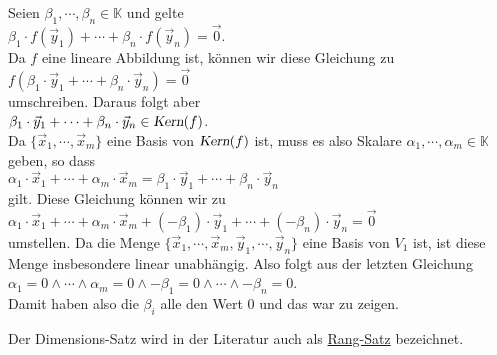 \begin{enumerate}
      Seien $\beta_1, \cdots, \beta_n \in \mathbb{K}$ und gelte
      \\[0.2cm]
      \hspace*{1.3cm}
      $\beta_1 \cdot f(\vec{y}_1) + \cdots + \beta_n \cdot f(\vec{y}_n) = \vec{0}$.
      \\[0.2cm]
      Da $f$ eine lineare Abbildung ist, k\"{o}nnen wir diese Gleichung zu
      \\[0.2cm]
      \hspace*{1.3cm}
      $f(\beta_1 \cdot \vec{y}_1 + \cdots + \beta_n \cdot \vec{y}_n) = \vec{0}$
      \\[0.2cm]
      umschreiben.  Daraus folgt aber
      \\[0.2cm]
      \hspace*{1.3cm}
      $\beta_1 \cdot \vec{y}_1 + \cdots + \beta_n \cdot \vec{y}_n \in \textsl{Kern}(f)$.
      \\[0.2cm]
      Da $\{ \vec{x}_1, \cdots, \vec{x}_m \}$ eine Basis von $\textsl{Kern}(f)$ ist, muss es also
      Skalare $\alpha_1, \cdots, \alpha_m \in \mathbb{K}$ geben, so dass
      \\[0.2cm]
      \hspace*{1.3cm}
      $\alpha_1 \cdot \vec{x}_1 + \cdots + \alpha_m \cdot \vec{x}_m = \beta_1 \cdot \vec{y}_1 + \cdots + \beta_n \cdot \vec{y}_n$
      \\[0.2cm]
      gilt.  Diese Gleichung k\"{o}nnen wir zu
      \\[0.2cm]
      \hspace*{1.3cm}
      $\alpha_1 \cdot \vec{x}_1 + \cdots + \alpha_m \cdot \vec{x}_m + (-\beta_1) \cdot \vec{y}_1 + \cdots + (-\beta_n) \cdot \vec{y}_n = \vec{0}$
      \\[0.2cm]
      umstellen.  Da die Menge $\{ \vec{x}_1, \cdots, \vec{x}_m,  \vec{y}_1, \cdots, \vec{y}_n \}$
      eine Basis von $V_1$ ist, ist diese Menge insbesondere linear unabh\"{a}ngig.  Also
      folgt aus der letzten Gleichung
      \\[0.2cm]
      \hspace*{1.3cm}
      $\alpha_1 = 0 \wedge \cdots \wedge \alpha_m = 0 \wedge -\beta_1 = 0 \wedge \cdots \wedge -\beta_n = 0$.
      \\[0.2cm]
      Damit haben also die $\beta_i$ alle den Wert $0$ und das war zu zeigen. \qeds
\end{enumerate}
\remark
Der Dimensions-Satz wird in der Literatur auch als \href{https://de.wikipedia.org/wiki/Rangsatz}{Rang-Satz} bezeichnet.
\eoxs

